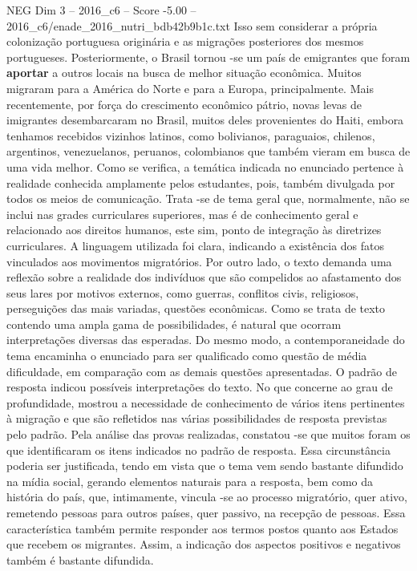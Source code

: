 \begin{textsample}{NEG Dim 3 – 2016\_c6 – Score -5.00 – 2016\_c6/enade\_2016\_nutri\_bdb42b9b1c.txt}
Isso sem considerar a própria colonização portuguesa originária e as migrações posteriores dos mesmos portugueses.
Posteriormente, o Brasil tornou -se um país de emigrantes que foram \textbf{aportar} a outros locais na busca de melhor situação econômica.
Muitos migraram para a América do Norte e para a Europa, principalmente.
Mais recentemente, por força do crescimento econômico pátrio, novas levas de imigrantes desembarcaram no Brasil, muitos deles provenientes do Haiti, embora tenhamos recebidos vizinhos latinos, como bolivianos, paraguaios, chilenos, argentinos, venezuelanos, peruanos, colombianos que também vieram em busca de uma vida melhor.
Como se verifica, a temática indicada no enunciado pertence à realidade conhecida amplamente pelos estudantes, pois, também divulgada por todos os meios de comunicação.
Trata -se de tema geral que, normalmente, não se inclui nas grades curriculares superiores, mas é de conhecimento geral e relacionado aos direitos humanos, este sim, ponto de integração às diretrizes curriculares.
A linguagem utilizada foi clara, indicando a existência dos fatos vinculados aos movimentos migratórios.
Por outro lado, o texto demanda uma reflexão sobre a realidade dos indivíduos que são compelidos ao afastamento dos seus lares por motivos externos, como guerras, conflitos civis, religiosos, perseguições das mais variadas, questões econômicas.
Como se trata de texto contendo uma ampla gama de possibilidades, é natural que ocorram interpretações diversas das esperadas.
Do mesmo modo, a contemporaneidade do tema encaminha o enunciado para ser qualificado como questão de média dificuldade, em comparação com as demais questões apresentadas.
O padrão de resposta indicou possíveis interpretações do texto.
No que concerne ao grau de profundidade, mostrou a necessidade de conhecimento de vários itens pertinentes à migração e que são refletidos nas várias possibilidades de resposta previstas pelo padrão.
Pela análise das provas realizadas, constatou -se que muitos foram os que identificaram os itens indicados no padrão de resposta.
Essa circunstância poderia ser justificada, tendo em vista que o tema vem sendo bastante difundido na mídia social, gerando elementos naturais para a resposta, bem como da história do país, que, intimamente, vincula -se ao processo migratório, quer ativo, remetendo pessoas para outros países, quer passivo, na recepção de pessoas.
Essa característica também permite responder aos termos postos quanto aos Estados que recebem os migrantes.
Assim, a indicação dos aspectos positivos e negativos também é bastante difundida.

\end{textsample}

